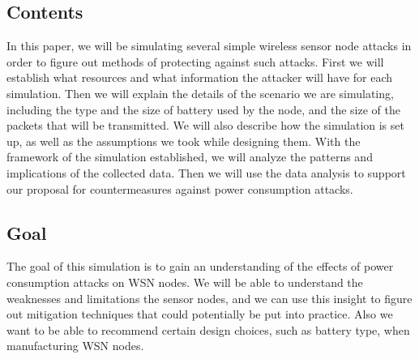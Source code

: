 \subsection{Contents}
In this paper, we will be simulating several simple wireless sensor node 
attacks in order to figure out methods of protecting against such attacks.
 First we will establish what resources and what information  
the attacker will have for each simulation. Then we will explain the 
details of the scenario we are simulating, including the type and the 
size of battery  used by the node, and the size of the packets that 
will be transmitted. We will also describe how the simulation is set up, 
as well as the assumptions we took while designing them. 
With the framework of the simulation established, we will analyze the 
patterns and implications of the collected data. Then we will use the 
data analysis to support our proposal for countermeasures against power 
consumption attacks.

\subsection{Goal}
The goal of this simulation is to gain an understanding of the 
effects of power consumption attacks on WSN nodes. We will be able 
to understand the weaknesses and limitations the sensor nodes, and 
we can use this insight to figure out mitigation techniques that 
could potentially be put into practice. Also we want to be able to 
recommend certain design choices, such as battery type, when 
manufacturing WSN nodes.

